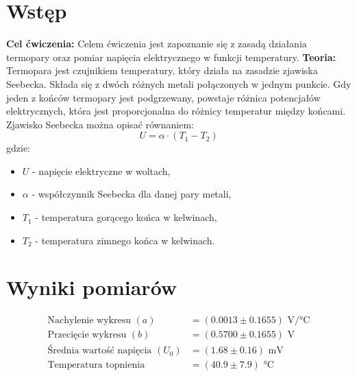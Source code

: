 \documentclass[11pt]{article}
\begin{document}
\section*{Wstęp}
\textbf{Cel ćwiczenia:} Celem ćwiczenia jest zapoznanie się z zasadą działania termopary oraz pomiar napięcia elektrycznego w funkcji temperatury.
\textbf{Teoria:} Termopara jest czujnikiem temperatury, który działa na zasadzie zjawiska Seebecka. Składa się z dwóch różnych metali połączonych w jednym punkcie. Gdy jeden z końców termopary jest podgrzewany, powstaje różnica potencjałów elektrycznych, która jest proporcjonalna do różnicy temperatur między końcami.
Zjawisko Seebecka można opisać równaniem:
\begin{equation}
    U = \alpha \cdot (T_1 - T_2)
\end{equation}
gdzie:
\begin{itemize}
    \item \( U \) - napięcie elektryczne w woltach,
    \item \( \alpha \) - współczynnik Seebecka dla danej pary metali,
    \item \( T_1 \) - temperatura gorącego końca w kelwinach,
    \item \( T_2 \) - temperatura zimnego końca w kelwinach.
\end{itemize}

\section*{Wyniki pomiarów}


\begin{align}
    \text{Nachylenie wykresu } (a) &= (0.0013 \pm 0.1655) \text{ V}/\text{°C} \\
    \text{Przecięcie wykresu } (b) &= (0.5700 \pm 0.1655) \text{ V} \\
    \text{Średnia wartość napięcia } (U_0) &= (1.68 \pm 0.16) \text{ mV} \\
    \text{Temperatura topnienia } &= (40.9 \pm 7.9) \text{ °C}
\end{align}
\end{document}
